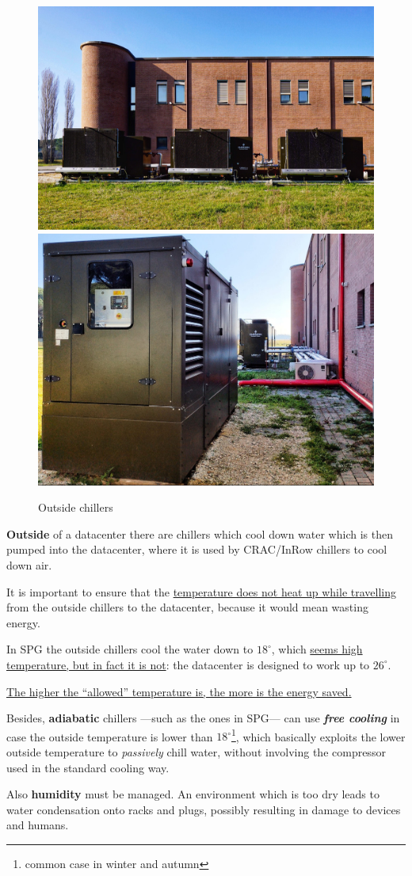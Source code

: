 \begin{figure}[htbp]
   \centering
   \includegraphics[width=0.45\columnwidth]{images/outside_chillers.jpeg}
   \includegraphics[width=0.405\columnwidth]{images/outside_chillers_2.jpeg}
   \caption{Outside chillers}
   \label{fig:outside_chillers}
\end{figure}
\textbf{Outside} of a datacenter there are chillers which cool down water which is then pumped into the datacenter, where it is used by CRAC/InRow chillers to cool down air.

It is important to ensure that the \ul{temperature does not heat up while travelling} from the outside chillers to the datacenter, because it would mean wasting energy. 

In SPG the outside chillers cool the water down to $18^{\circ}$, which \ul{seems high temperature, but in fact it is not}: the datacenter is designed to work up to $26^{\circ}$.
\begin{center}
   \ul{The higher the ``allowed'' temperature is, the more is the energy saved.}
\end{center}
Besides, \textbf{adiabatic} chillers ---such as the ones in SPG--- can use \textit{\textbf{free cooling}} in case the outside temperature is lower than $18^{\circ}$\footnote{common case in winter and autumn}, 
which basically exploits the lower outside temperature to \textit{passively} chill water, without involving the compressor used in the standard cooling way.
   
\nl

Also \textbf{humidity} must be managed. An environment which is too dry leads to water condensation onto racks and plugs, possibly resulting in damage to devices and humans.

